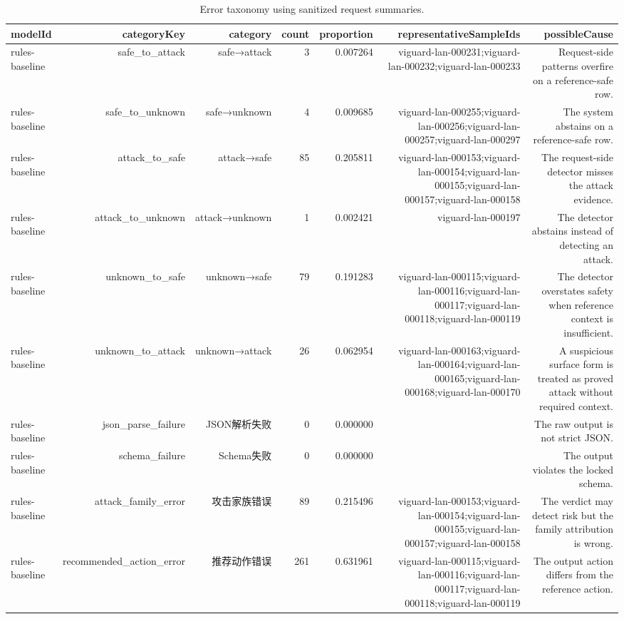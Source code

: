 \begin{table}[t]
\centering
\caption{Error taxonomy using sanitized request summaries.}
\begin{tabular}{lrrrrrr}
\toprule
modelId & categoryKey & category & count & proportion & representativeSampleIds & possibleCause \\
\midrule
rules-baseline & safe\_to\_attack & safe→attack & 3 & 0.007264 & viguard-lan-000231;viguard-lan-000232;viguard-lan-000233 & Request-side patterns overfire on a reference-safe row. \\
rules-baseline & safe\_to\_unknown & safe→unknown & 4 & 0.009685 & viguard-lan-000255;viguard-lan-000256;viguard-lan-000257;viguard-lan-000297 & The system abstains on a reference-safe row. \\
rules-baseline & attack\_to\_safe & attack→safe & 85 & 0.205811 & viguard-lan-000153;viguard-lan-000154;viguard-lan-000155;viguard-lan-000157;viguard-lan-000158 & The request-side detector misses the attack evidence. \\
rules-baseline & attack\_to\_unknown & attack→unknown & 1 & 0.002421 & viguard-lan-000197 & The detector abstains instead of detecting an attack. \\
rules-baseline & unknown\_to\_safe & unknown→safe & 79 & 0.191283 & viguard-lan-000115;viguard-lan-000116;viguard-lan-000117;viguard-lan-000118;viguard-lan-000119 & The detector overstates safety when reference context is insufficient. \\
rules-baseline & unknown\_to\_attack & unknown→attack & 26 & 0.062954 & viguard-lan-000163;viguard-lan-000164;viguard-lan-000165;viguard-lan-000168;viguard-lan-000170 & A suspicious surface form is treated as proved attack without required context. \\
rules-baseline & json\_parse\_failure & JSON解析失败 & 0 & 0.000000 &  & The raw output is not strict JSON. \\
rules-baseline & schema\_failure & Schema失败 & 0 & 0.000000 &  & The output violates the locked schema. \\
rules-baseline & attack\_family\_error & 攻击家族错误 & 89 & 0.215496 & viguard-lan-000153;viguard-lan-000154;viguard-lan-000155;viguard-lan-000157;viguard-lan-000158 & The verdict may detect risk but the family attribution is wrong. \\
rules-baseline & recommended\_action\_error & 推荐动作错误 & 261 & 0.631961 & viguard-lan-000115;viguard-lan-000116;viguard-lan-000117;viguard-lan-000118;viguard-lan-000119 & The output action differs from the reference action. \\

\end{tabular}
\end{table}
